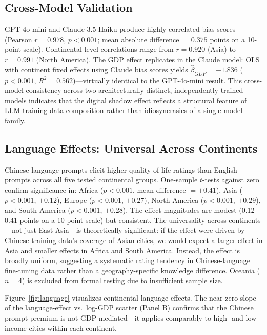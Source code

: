 \documentclass[12pt]{article}
\begin{document}
\subsection{Cross-Model Validation}

GPT-4o-mini and Claude-3.5-Haiku produce highly correlated bias scores (Pearson $r = 0.978$, $p < 0.001$; mean absolute difference $= 0.375$ points on a 10-point scale). Continental-level correlations range from $r = 0.920$ (Asia) to $r = 0.991$ (North America). The GDP effect replicates in the Claude model: OLS with continent fixed effects using Claude bias scores yields $\hat{\beta}_{GDP} = -1.836$ ($p < 0.001$, $R^2 = 0.562$)---virtually identical to the GPT-4o-mini result. This cross-model consistency across two architecturally distinct, independently trained models indicates that the digital shadow effect reflects a structural feature of LLM training data composition rather than idiosyncrasies of a single model family.

\subsection{Language Effects: Universal Across Continents}
\label{sec:language}

Chinese-language prompts elicit higher quality-of-life ratings than English prompts across all five tested continental groups. One-sample $t$-tests against zero confirm significance in: Africa ($p < 0.001$, mean difference $= +0.41$), Asia ($p < 0.001$, $+0.12$), Europe ($p < 0.001$, $+0.27$), North America ($p < 0.001$, $+0.29$), and South America ($p < 0.001$, $+0.28$). The effect magnitudes are modest (0.12--0.41 points on a 10-point scale) but consistent. The universality across continents---not just East Asia---is theoretically significant: if the effect were driven by Chinese training data's coverage of Asian cities, we would expect a larger effect in Asia and smaller effects in Africa and South America. Instead, the effect is broadly uniform, suggesting a systematic rating tendency in Chinese-language fine-tuning data rather than a geography-specific knowledge difference. Oceania ($n = 4$) is excluded from formal testing due to insufficient sample size.

Figure~\ref{fig:language} visualizes continental language effects. The near-zero slope of the language-effect vs.\ log-GDP scatter (Panel B) confirms that the Chinese prompt premium is not GDP-mediated---it applies comparably to high- and low-income cities within each continent.
\end{document}
